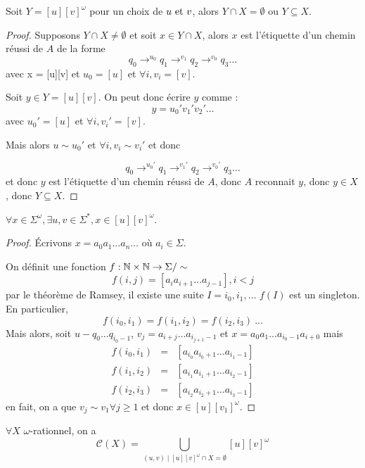 \begin{prop}\label{prop:buchi1}
	Soit $Y = [u][v]^{\omega}$ pour un choix de $u \text{ et } v$, alors $Y \cap X = \emptyset$ ou $Y \subseteq X$.
\end{prop}


\begin{proof}
	Supposons $Y \cap X \neq \emptyset$ et soit $x \in Y \cap X$, alors $x$ est l'étiquette d'un chemin réussi de $A$
	de la forme
	$$q_0 \to^{u_0} q_1 \to^{v_1} q_2 \to^{v_0} q_3 \ldots$$
	avec x = [u][v] et $u_0 = [u]$ et $\forall i, v_i = [v]$.

	Soit $y \in Y = [u][v]$. On peut donc écrire $y$ comme :
	$$ y = u_0'v_1'v_2'\ldots$$
	avec $u_0' = [u]$ et $\forall i, v_i' = [v]$.

	Mais alors $u \sim u_0'$ et $\forall i, v_i \sim v_i'$ et donc

	$$q_0 \to^{u_0'} q_1 \to^{v_1'} q_2 \to^{v_0'} q_3 \ldots$$
	et donc $y$ est l'étiquette d'un chemin réussi de $A$, donc $A$ reconnait $y$, donc $y \in X$, donc $Y \subseteq X$.
\end{proof}



\begin{prop}\label{prop:buchi2}
	$\forall x \in \Sigma^{\omega}, \exists u,v \in \Sigma^*, x \in [u][v]^{\omega}$.
\end{prop}


\begin{proof}
	Écrivons $x = a_0a_1 \ldots a_n \ldots$ où $a_i \in \Sigma$.

	On définit une fonction $f : \mathbb{N} \times \mathbb{N} \to \Sigma/\sim$
	$$f(i,j) = [a_ia_{i+1}\ldots a_{j-1}], i < j$$
	par le théorème de Ramsey, il existe une suite $I = i_0,i_1,\ldots$ \tlq $f(I)$ est un singleton.
	En particulier,
	$$f(i_0,i_1) = f(i_1,i_2) = f(i_2,i_3) \ \ldots$$
	Mais alors, soit $u - q_0 \ldots q_{i_0-1}$, $v_j = a_{i+j} \ldots a_{{i_{j+1} -1}}$ et $x = a_0a_ 1\ldots a_{i_0-1}a_{i+0}$
	mais
	\begin{eqnarray*}
		f(i_0,i_1) &=& [a_{i_0} a_{i_0+1}\ldots a_{i_1-1}] \\
		f(i_1,i_2) &=& [a_{i_1} a_{i_1+1}\ldots a_{i_2-1}] \\
		f(i_2,i_3) &=& [a_{i_2} a_{i_2+1}\ldots a_{i_3-1}]
	\end{eqnarray*}
	en fait, on a que $v_j \sim v_1 \forall j \geq 1$ et donc $x \in [u][v_1]^{\omega}$.
\end{proof}

\begin{theorem}
	$\forall X$ $\omega$-rationnel, on a
	$$ \mathcal{C}(X) = \bigcup_{(u,v) \mid [u][v]^{\omega} \cap X = \emptyset} [u][v]^{\omega}$$
\end{theorem}

